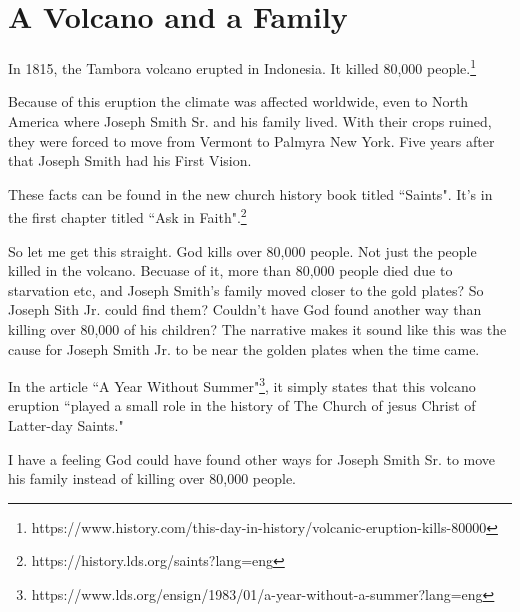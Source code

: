 \chapter{A Volcano and a Family}

In 1815, the Tambora volcano erupted in Indonesia. It killed 80,000 people.\footnote{
https://www.history.com/this-day-in-history/volcanic-eruption-kills-80000
}

Because of this eruption the climate was affected worldwide, even to North America
where Joseph Smith Sr. and his family lived. With their crops ruined, they were
forced to move from Vermont to Palmyra New York. Five years after that Joseph Smith
had his First Vision.

These facts can be found in the new church history book titled ``Saints". It's in the
first chapter titled ``Ask in Faith".\footnote{https://history.lds.org/saints?lang=eng}

So let me get this straight. God kills over 80,000 people. Not just the people killed
in the volcano. Becuase of it, more than 80,000 people died due to starvation etc,
and Joseph Smith's family moved closer to the gold plates? So Joseph Sith Jr. could
find them? Couldn't have God found another way than killing over 80,000 of his
children? The narrative makes it sound like this was the cause for Joseph Smith Jr.
to be near the golden plates when the time came.

In the article ``A Year Without Summer"\footnote{
https://www.lds.org/ensign/1983/01/a-year-without-a-summer?lang=eng}, it simply
states that this volcano eruption ``played a small role in the history of The Church
of jesus Christ of Latter-day Saints."

I have a feeling God could have found other ways for Joseph Smith Sr. to move his
family instead of killing over 80,000 people.